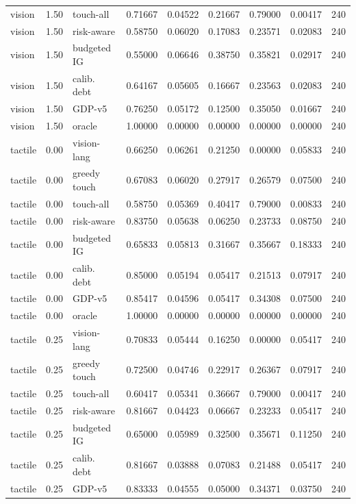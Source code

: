 \documentclass{article}
\begin{document}
\begin{center}
\begin{longtable}{lllllllll}
vision & 1.50 & touch-all & 0.71667 & 0.04522 & 0.21667 & 0.79000 & 0.00417 & 240 \\
vision & 1.50 & risk-aware & 0.58750 & 0.06020 & 0.17083 & 0.23571 & 0.02083 & 240 \\
vision & 1.50 & budgeted IG & 0.55000 & 0.06646 & 0.38750 & 0.35821 & 0.02917 & 240 \\
vision & 1.50 & calib. debt & 0.64167 & 0.05605 & 0.16667 & 0.23563 & 0.02083 & 240 \\
vision & 1.50 & GDP-v5 & 0.76250 & 0.05172 & 0.12500 & 0.35050 & 0.01667 & 240 \\
vision & 1.50 & oracle & 1.00000 & 0.00000 & 0.00000 & 0.00000 & 0.00000 & 240 \\
tactile & 0.00 & vision-lang & 0.66250 & 0.06261 & 0.21250 & 0.00000 & 0.05833 & 240 \\
tactile & 0.00 & greedy touch & 0.67083 & 0.06020 & 0.27917 & 0.26579 & 0.07500 & 240 \\
tactile & 0.00 & touch-all & 0.58750 & 0.05369 & 0.40417 & 0.79000 & 0.00833 & 240 \\
tactile & 0.00 & risk-aware & 0.83750 & 0.05638 & 0.06250 & 0.23733 & 0.08750 & 240 \\
tactile & 0.00 & budgeted IG & 0.65833 & 0.05813 & 0.31667 & 0.35667 & 0.18333 & 240 \\
tactile & 0.00 & calib. debt & 0.85000 & 0.05194 & 0.05417 & 0.21513 & 0.07917 & 240 \\
tactile & 0.00 & GDP-v5 & 0.85417 & 0.04596 & 0.05417 & 0.34308 & 0.07500 & 240 \\
tactile & 0.00 & oracle & 1.00000 & 0.00000 & 0.00000 & 0.00000 & 0.00000 & 240 \\
tactile & 0.25 & vision-lang & 0.70833 & 0.05444 & 0.16250 & 0.00000 & 0.05417 & 240 \\
tactile & 0.25 & greedy touch & 0.72500 & 0.04746 & 0.22917 & 0.26367 & 0.07917 & 240 \\
tactile & 0.25 & touch-all & 0.60417 & 0.05341 & 0.36667 & 0.79000 & 0.00417 & 240 \\
tactile & 0.25 & risk-aware & 0.81667 & 0.04423 & 0.06667 & 0.23233 & 0.05417 & 240 \\
tactile & 0.25 & budgeted IG & 0.65000 & 0.05989 & 0.32500 & 0.35671 & 0.11250 & 240 \\
tactile & 0.25 & calib. debt & 0.81667 & 0.03888 & 0.07083 & 0.21488 & 0.05417 & 240 \\
tactile & 0.25 & GDP-v5 & 0.83333 & 0.04555 & 0.05000 & 0.34371 & 0.03750 & 240 \\

\end{longtable}
\end{center}
\end{document}
